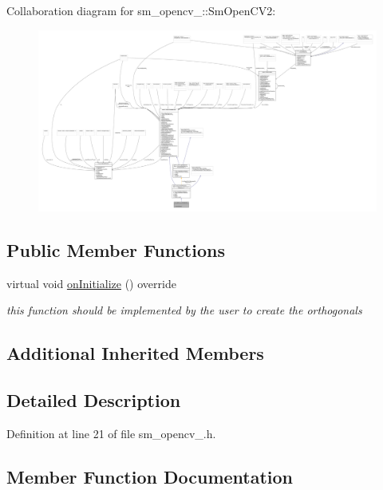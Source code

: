 Collaboration diagram for sm\+\_\+opencv\+\_\+:\+:Sm\+Open\+C\+V2\+:
\nopagebreak
\begin{figure}[H]
\begin{center}
\leavevmode
\includegraphics[width=350pt]{structsm__opencv__2_1_1SmOpenCV2__coll__graph}
\end{center}
\end{figure}
\subsection*{Public Member Functions}
\begin{DoxyCompactItemize}
\item 
virtual void \hyperlink{structsm__opencv__2_1_1SmOpenCV2_a3fa2a5e2bd0ea90ec283068d817783c0}{on\+Initialize} () override
\begin{DoxyCompactList}\small\item\em this function should be implemented by the user to create the orthogonals \end{DoxyCompactList}\end{DoxyCompactItemize}
\subsection*{Additional Inherited Members}


\subsection{Detailed Description}


Definition at line 21 of file sm\+\_\+opencv\+\_.\+h.



\subsection{Member Function Documentation}
\mbox{\label{structsm__opencv__2_1_1SmOpenCV2_a3fa2a5e2bd0ea90ec283068d817783c0}} 
